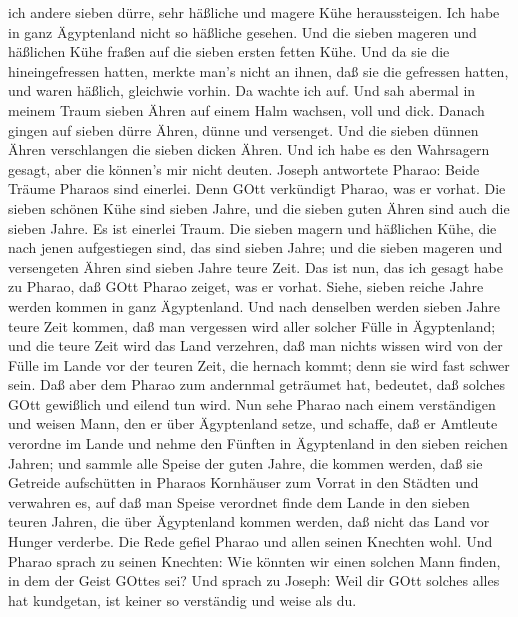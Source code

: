 ich andere sieben dürre, sehr häßliche und magere Kühe heraussteigen.
Ich habe in ganz Ägyptenland nicht so häßliche gesehen. 
Und die sieben mageren und häßlichen Kühe fraßen auf die sieben ersten
fetten Kühe.  Und da sie die hineingefressen hatten, merkte
man's nicht an ihnen, daß sie die gefressen hatten, und waren häßlich,
gleichwie vorhin. Da wachte ich auf.  Und sah abermal in
meinem Traum sieben Ähren auf einem Halm wachsen, voll und dick.
 Danach gingen auf sieben dürre Ähren, dünne und versenget.
 Und die sieben dünnen Ähren verschlangen die sieben dicken
Ähren. Und ich habe es den Wahrsagern gesagt, aber die können's mir
nicht deuten.  Joseph antwortete Pharao: Beide Träume
Pharaos sind einerlei. Denn GOtt verkündigt Pharao, was er vorhat.
 Die sieben schönen Kühe sind sieben Jahre, und die sieben
guten Ähren sind auch die sieben Jahre. Es ist einerlei Traum.
 Die sieben magern und häßlichen Kühe, die nach jenen
aufgestiegen sind, das sind sieben Jahre; und die sieben mageren und
versengeten Ähren sind sieben Jahre teure Zeit.  Das ist
nun, das ich gesagt habe zu Pharao, daß GOtt Pharao zeiget, was er
vorhat.  Siehe, sieben reiche Jahre werden kommen in ganz
Ägyptenland.  Und nach denselben werden sieben Jahre teure
Zeit kommen, daß man vergessen wird aller solcher Fülle in Ägyptenland;
und die teure Zeit wird das Land verzehren,  daß man nichts
wissen wird von der Fülle im Lande vor der teuren Zeit, die hernach
kommt; denn sie wird fast schwer sein.  Daß aber dem Pharao
zum andernmal geträumet hat, bedeutet, daß solches GOtt gewißlich und
eilend tun wird.  Nun sehe Pharao nach einem verständigen
und weisen Mann, den er über Ägyptenland setze,  und
schaffe, daß er Amtleute verordne im Lande und nehme den Fünften in
Ägyptenland in den sieben reichen Jahren;  und sammle alle
Speise der guten Jahre, die kommen werden, daß sie Getreide aufschütten
in Pharaos Kornhäuser zum Vorrat in den Städten und verwahren es,
 auf daß man Speise verordnet finde dem Lande in den sieben
teuren Jahren, die über Ägyptenland kommen werden, daß nicht das Land
vor Hunger verderbe.  Die Rede gefiel Pharao und allen
seinen Knechten wohl.  Und Pharao sprach zu seinen
Knechten: Wie könnten wir einen solchen Mann finden, in dem der Geist
GOttes sei?  Und sprach zu Joseph: Weil dir GOtt solches
alles hat kundgetan, ist keiner so verständig und weise als du.
